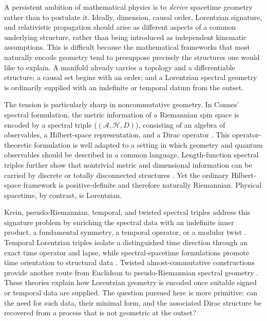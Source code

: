 \documentclass[11pt]{article}
\theoremstyle{definition}
\theoremstyle{remark}
\newcommand{\A}{\mathcal{A}}
\newcommand{\Hh}{\mathcal{H}}
\begin{document}
A persistent ambition of mathematical physics is to \emph{derive} spacetime
geometry rather than to postulate it.  Ideally, dimension, causal order,
Lorentzian signature, and relativistic propagation should arise as different
aspects of a common underlying structure, rather than being introduced as
independent kinematic assumptions.  This is difficult because the mathematical
frameworks that most naturally encode geometry tend to presuppose precisely
the structures one would like to explain.  A manifold already carries a
topology and a differentiable structure; a causal set begins with an order;
and a Lorentzian spectral geometry is ordinarily supplied with an indefinite
or temporal datum from the outset.

The tension is particularly sharp in noncommutative geometry.  In Connes'
spectral formulation, the metric information of a Riemannian spin space is
encoded by a spectral triple ($(\A,\Hh,D)$), consisting of an algebra of
observables, a Hilbert-space representation, and a Dirac operator
\cite{connes}.  This operator-theoretic formulation is well adapted to a
setting in which geometry and quantum observables should be described in a
common language.  Length-function spectral triples further show that
nontrivial metric and dimensional information can be carried by discrete or
totally disconnected structures
\cite{connes1989,christensenivan2006,pearson-bellissard,
kellendonksavinien2012}.  Yet the ordinary Hilbert-space framework is
positive-definite and therefore naturally Riemannian.  Physical spacetime,
by contrast, is Lorentzian.

Krein, pseudo-Riemannian, temporal, and twisted spectral triples address this
signature problem by enriching the spectral data with an indefinite inner
product, a fundamental symmetry, a temporal operator, or a modular twist
\cite{bognar,strohmaier,PaschkeSitarz2006,
VanDenDungenPaschkeRennie2013,franco,franco-eckstein,
vandendungen2016,bizibrouderbesnard2018,connes-moscovici}.
Temporal Lorentzian triples isolate a distinguished time direction through an
exact time operator and lapse, while spectral-spacetime formulations promote
time orientation to structural data
\cite{Franco2014Temporal,EcksteinFranco2015,
Besnard2017Spacetimes}.  Twisted almost-commutative constructions provide
another route from Euclidean to pseudo-Riemannian spectral geometry
\cite{DevastatoFarnsworthLizziMartinetti2018,
DevastatoFilaciMartinettiSingh2020,nieuviarts2026a,
nieuviarts2026b}.  These theories explain how Lorentzian geometry is encoded
once suitable signed or temporal data are supplied.  The question pursued
here is more primitive: can the need for such data, their minimal form, and
the associated Dirac structure be recovered from a process that is not
geometric at the outset?
\end{document}
